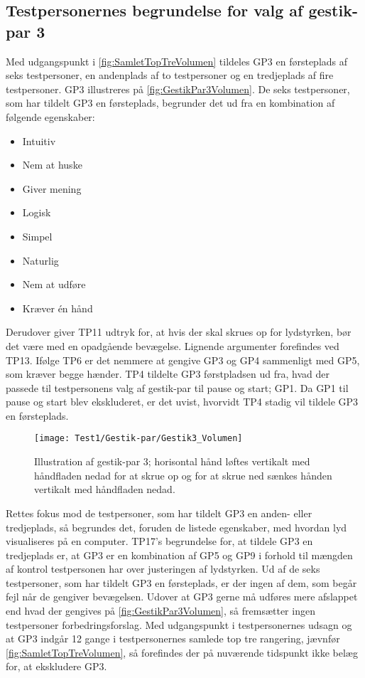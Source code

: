 \subsection{Testpersonernes begrundelse for valg af gestik-par 3}
\label{TestresultaterValgAfGestikkerBegrundelseGP3Volumen}
%
Med udgangspunkt i \autoref{fig:SamletTopTreVolumen} tildeles GP3 en førsteplads af seks testpersoner, en andenplads af to testpersoner og en tredjeplads af fire testpersoner. GP3 illustreres på \autoref{fig:GestikPar3Volumen}. De seks testpersoner, som har tildelt GP3 en førsteplads, begrunder det ud fra en kombination af følgende egenskaber: 
%
\begin{multicols}{3}
    \begin{itemize}
        \item Intuitiv
        \item Nem at huske
        \item Giver mening
        \item Logisk
        \item Simpel
        \item Naturlig
        \item Nem at udføre
        \item Kræver én hånd
\end{itemize}
\end{multicols}
\noindent
%
Derudover giver TP11 udtryk for, at hvis der skal skrues op for lydstyrken, bør det være med en opadgående bevægelse. Lignende argumenter forefindes ved TP13. Ifølge TP6 er det nemmere at gengive GP3 og GP4 sammenligt med GP5, som kræver begge hænder. TP4 tildelte GP3 førstpladsen ud fra, hvad der passede til testpersonens valg af gestik-par til pause og start; GP1. Da GP1 til pause og start blev ekskluderet, er det uvist, hvorvidt TP4 stadig vil tildele GP3 en førsteplads. 
%
\begin{figure}[H]
	\centering
	\texttt{[image: Test1/Gestik-par/Gestik3\_Volumen]}
	\caption{Illustration af gestik-par 3; horisontal hånd løftes vertikalt med håndfladen nedad for at skrue op og for at skrue ned sænkes hånden vertikalt med håndfladen nedad.}
	\label{fig:GestikPar3Volumen}
\end{figure}
\noindent
%
Rettes fokus mod de testpersoner, som har tildelt GP3 en anden- eller tredjeplads, så begrundes det, foruden de listede egenskaber, med hvordan lyd visualiseres på en computer. TP17's begrundelse for, at tildele GP3 en tredjeplads er, at GP3 er en kombination af GP5 og GP9 i forhold til mængden af kontrol testpersonen har over justeringen af lydstyrken. \blankline
%      
Ud af de seks testpersoner, som har tildelt GP3 en førsteplads, er der ingen af dem, som begår fejl når de gengiver bevægelsen. Udover at GP3 gerne må udføres mere afslappet end hvad der gengives på \autoref{fig:GestikPar3Volumen}, så fremsætter ingen testpersoner forbedringsforslag.\blankline
%
Med udgangspunkt i testpersonernes udsagn og at GP3 indgår 12 gange i testpersonernes samlede top tre rangering, jævnfør \autoref{fig:SamletTopTreVolumen}, så forefindes der på nuværende tidspunkt ikke belæg for, at ekskludere GP3. 
%
